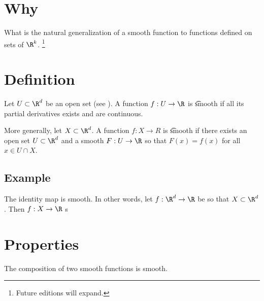
\section*{Why}

What is the natural generalization of a smooth function to functions defined on sets of $\R ^k$.
    \ifhmode\unskip\fi\footnote{
Future editions will expand.
    }

\section*{Definition}

Let $U \subset \R ^d$ be an open set (see ).
A function $f: U \to \R $ is \t{smooth} if all its partial derivatives exists and are continuous.

More generally, let $X \subset \R ^d$.
A function $f: X \to R$ is \t{smooth} if there exists an open set $U \subset \R ^d$ and a smooth $F: U \to \R $ so that $F(x) = f(x)$ for all $x \in U \cap  X$.

\subsection*{Example}

The identity map is smooth.
In other words, let $f: \R ^d \to \R $ be so that $X \subset \R ^d$.
Then $f: X \to \R $ s

\section*{Properties}

\begin{proposition}The composition of two smooth functions is smooth.\end{proposition}
\blankpage